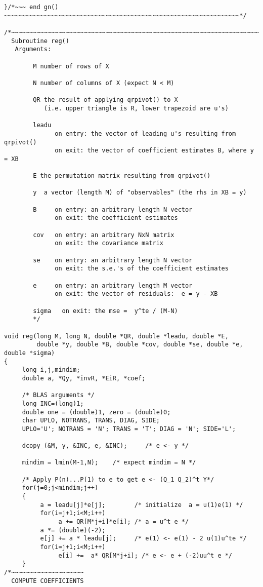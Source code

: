 \documentclass{article}
\begin{document}
{\begin{verbatim}
}/*~~~ end gn() ~~~~~~~~~~~~~~~~~~~~~~~~~~~~~~~~~~~~~~~~~~~~~~~~~~~~~~~~~~~~~~~~~*/

/*~~~~~~~~~~~~~~~~~~~~~~~~~~~~~~~~~~~~~~~~~~~~~~~~~~~~~~~~~~~~~~~~~~~~~~
  Subroutine reg()
   Arguments:
           
        M number of rows of X
 
        N number of columns of X (expect N < M)

        QR the result of applying qrpivot() to X
           (i.e. upper triangle is R, lower trapezoid are u's)

        leadu
              on entry: the vector of leading u's resulting from qrpivot()
              on exit: the vector of coefficient estimates B, where y = XB

        E the permutation matrix resulting from qrpivot()

        y  a vector (length M) of "observables" (the rhs in XB = y)

        B     on entry: an arbitrary length N vector
              on exit: the coefficient estimates
                     
        cov   on entry: an arbitrary NxN matrix
              on exit: the covariance matrix

        se    on entry: an arbitrary length N vector
              on exit: the s.e.'s of the coefficient estimates

        e     on entry: an arbitrary length M vector
              on exit: the vector of residuals:  e = y - XB
           
        sigma   on exit: the mse =  y^te / (M-N)
        */
        
void reg(long M, long N, double *QR, double *leadu, double *E, 
         double *y, double *B, double *cov, double *se, double *e, double *sigma)
{
     long i,j,mindim;
     double a, *Qy, *invR, *EiR, *coef;

     /* BLAS arguments */
     long INC=(long)1;
     double one = (double)1, zero = (double)0;
     char UPLO, NOTRANS, TRANS, DIAG, SIDE; 
     UPLO='U'; NOTRANS = 'N'; TRANS = 'T'; DIAG = 'N'; SIDE='L';
  
     dcopy_(&M, y, &INC, e, &INC);     /* e <- y */

     mindim = lmin(M-1,N);    /* expect mindim = N */

     /* Apply P(n)...P(1) to e to get e <- (Q_1 Q_2)^t Y*/
     for(j=0;j<mindim;j++)
     {
          a = leadu[j]*e[j];        /* initialize  a = u(1)e(1) */
          for(i=j+1;i<M;i++)
               a += QR[M*j+i]*e[i]; /* a = u^t e */
          a *= (double)(-2);
          e[j] += a * leadu[j];     /* e(1) <- e(1) - 2 u(1)u^te */
          for(i=j+1;i<M;i++)
               e[i] +=  a* QR[M*j+i]; /* e <- e + (-2)uu^t e */
     }
/*~~~~~~~~~~~~~~~~~~~~
  COMPUTE COEFFICIENTS
  

\end{verbatim}}
\end{document}
